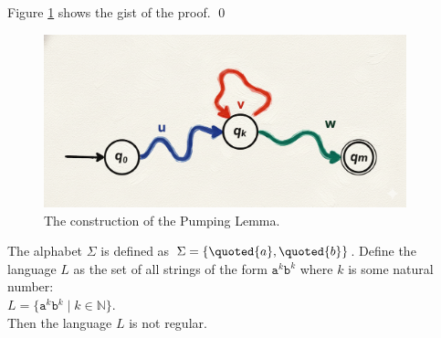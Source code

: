 Figure \ref{fig:pumping-lemma-proof.png} shows the gist of the proof.
\qed

\begin{figure}[h] 
\centering
  \includegraphics[width=10.5cm]{Abbildungen/pumping-lemma-proof.png}
\caption{The construction of the Pumping Lemma.}
\label{fig:pumping-lemma-proof.png}
\end{figure}



\begin{Proposition}
  The alphabet  $\Sigma$ is defined as $\Sigma = \{ \quoted{a}, \quoted{b} \}$.
  Define the language $L$ as the set of all strings of the form $\mathtt{a}^k\mathtt{b}^k$ where $k$
  is some natural number:
  \\[0.2cm]
  \hspace*{1.3cm}
  $L = \bigl\{ \mathtt{a}^k\mathtt{b}^k \mid k \in \mathbb{N} \bigr\}$.
  \\[0.2cm]
  Then the language  $L$ is not regular.
\end{Proposition}

